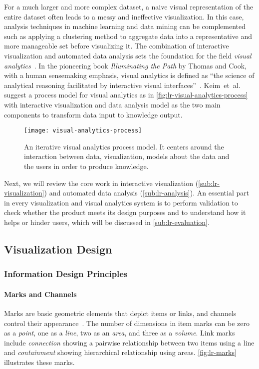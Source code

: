 For a much larger and more complex dataset, a naive visual representation of the entire dataset often leads to a messy and ineffective visualization. In this case, analysis techniques in machine learning and data mining can be complemented such as applying a clustering method to aggregate data into a representative and more manageable set before visualizing it. The combination of interactive visualization and automated data analysis sets the foundation for the field \emph{visual analytics}~\cite{Keim2008}. In the pioneering book \emph{Illuminating the Path} by Thomas and Cook, with a human sensemaking emphasis, visual analytics is defined as ``the science of analytical reasoning facilitated by interactive visual interfaces''~\cite{Thomas2005}. Keim~et~al.~\cite{Keim2010} suggest a process model for visual analytics as in \autoref{fig:lr-visual-analytics-process} with interactive visualization and data analysis model as the two main components to transform data input to knowledge output. 

\begin{figure}[!htb]
	\centering
	\texttt{[image: visual-analytics-process]}
	\caption{An iterative visual analytics process model. It centers around the interaction between data, visualization, models about the data and the users in order to produce knowledge. }
	\label{fig:lr-visual-analytics-process}
\end{figure}

Next, we will review the core work in interactive visualization (\autoref{sub:lr-visualization}) and automated data analysis (\autoref{sub:lr-analysis}). An essential part in every visualization and visual analytics system is to perform validation to check whether the product meets its design purposes and to understand how it helps or hinder users, which will be discussed in \autoref{sub:lr-evaluation}.

\subsection{Visualization Design}
\label{sub:lr-visualization}

\subsubsection{Information Design Principles}
\label{sub:lr-design}

\paragraph{Marks and Channels}
Marks are basic geometric elements that depict items or links, and channels control their appearance~\cite{Munzner2014}. The number of dimensions in item marks can be zero as a \emph{point}, one as a \emph{line}, two as an \emph{area}, and three as a \emph{volume}. Link marks include \emph{connection} showing a pairwise relationship between two items using a line and \emph{containment} showing hierarchical relationship using areas. \autoref{fig:lr-marks} illustrates these marks. 


